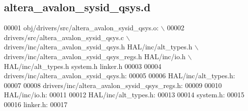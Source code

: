 \subsection{altera\+\_\+avalon\+\_\+sysid\+\_\+qsys.\+d}
\label{altera__avalon__sysid__qsys_8d_source}

\begin{DoxyCode}
00001 obj/drivers/src/altera\_avalon\_sysid\_qsys.o: \(\backslash\)
00002  drivers/src/altera\_avalon\_sysid\_qsys.c \(\backslash\)
 drivers/inc/altera\_avalon\_sysid\_qsys.h HAL/inc/alt\_types.h \(\backslash\)
 drivers/inc/altera\_avalon\_sysid\_qsys\_regs.h HAL/inc/io.h \(\backslash\)
 HAL/inc/alt\_types.h system.h linker.h
00003 
00004 drivers/inc/altera\_avalon\_sysid\_qsys.h:
00005 
00006 HAL/inc/alt\_types.h:
00007 
00008 drivers/inc/altera\_avalon\_sysid\_qsys\_regs.h:
00009 
00010 HAL/inc/io.h:
00011 
00012 HAL/inc/alt\_types.h:
00013 
00014 system.h:
00015 
00016 linker.h:
00017 \end{DoxyCode}
